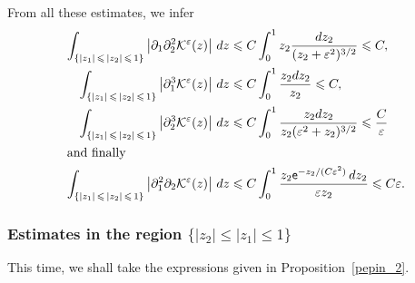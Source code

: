 \documentclass[AHL,Unicode,longabstracts,published]{cedram}
\newcommand*\p{\partial}
\newcommand*\BK{\mathcal{K}}
\newcommand*\ex{{\sf e}}
\newcommand*\ls{\leqslant }
\newcommand*\e{\varepsilon}
\begin{document}
From all these estimates, we infer
\begin{align*}
\int_{\left\{ |z_1 |\,\ls\,|z_2|\,\ls\,1\right\}} \left\lvert \p_1 \p_2^2 \BK^\e (z) \right\rvert \, dz
&\ls C \int_0^1 z_2 \frac{dz_2 }{ (z_2+\e^2)^{3/2}}
\ls C,
\\
\int_{\left\{ |z_1 |\,\ls\,|z_2|\,\ls\,1\right\}} \left\lvert \p_1^3 \BK^\e (z) \right\rvert \, dz
&\ls C \int_0^1 \frac{ z_2 dz_2 }{ z_2 }
\ls C,
\\
\int_{\left\{ |z_1 |\,\ls\,|z_2|\,\ls\,1\right\}} \left\lvert \p_2^3 \BK^\e (z) \right\rvert \, dz
&\ls C \int_0^1 \frac{ z_2 dz_2 }{ z_2 (\e^2 + z_2)^{3/2}}
\ls \frac{ C}{\e}
\\
\intertext{and finally}
\int_{\left\{ |z_1 |\,\ls\,|z_2|\,\ls\,1\right\}} \left\lvert \p_1^2 \p_2 \BK^\e (z) \right\rvert \, dz &\ls C \int_0^1 \frac{ z_2 \ex^{ - z_2 /(C\e^2) } \, dz_2}{ \e z_2 }
\ls C \e.
\end{align*}



\subsubsection{Estimates in the region \texorpdfstring{$\{ |z_2 | \ls |z_1| \ls 1 \} $}{{ |z2 | ls |z1| ls 1 } }}

This time, we shall take the expressions given in Proposition~\ref{pepin_2}.
\end{document}
